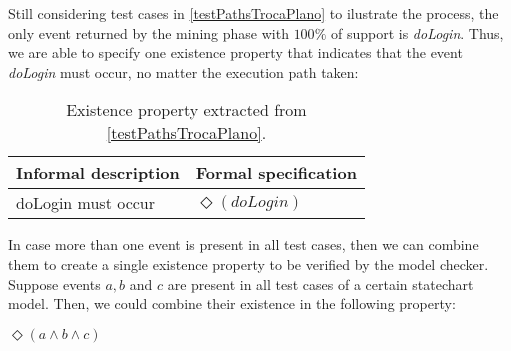 Still considering test cases in \ref{testPathsTrocaPlano} to ilustrate the process, the only event returned by the mining phase with $100\%$ of support is \textit{doLogin}. Thus, we are able to specify one existence property that indicates that the event \textit{doLogin} must occur, no matter the execution path taken:

\begin{table}[h]
\begin{center}
\begin{tabular}{|l | l|}

\hline

Informal description & Formal specification \\ \hline

doLogin must occur & $\Diamond (doLogin)$ \\

\hline
\end{tabular}
\end{center}
\caption{Existence property extracted from \ref{testPathsTrocaPlano}.}
\label{existencePropertyTrocaPlano}
\end{table}

In case more than one event is present in all test cases, then we can combine them to create a single existence property to be verified by the model checker. Suppose events $a, b$ and $c$ are present in all test cases of a certain statechart model. Then, we could combine their existence in the following property:

\begin{center}
$\Diamond (a \wedge b \wedge c)$
\end{center}
